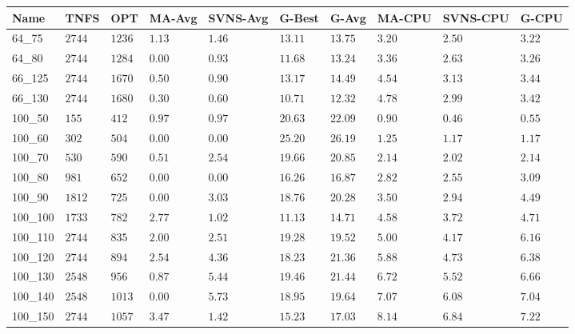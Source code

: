 \begin{center}
\begin{table}[]
\centering
\begin{tabular}{|lll|l|l|ll|lll|}
\hline
Name     & TNFS        & OPT    & MA-Avg & SVNS-Avg & G-Best & G-Avg & MA-CPU & SVNS-CPU & G-CPU \\
\hline
64\_75   & $2744   $   & $1236$ & $1.13$ & $1.46$   & $13.11$    & $13.75$   & $3.20 $& $2.50$   & $3.22 $ \\
64\_80   & $2744   $   & $1284$ & $\bm{0.00}$ & $0.93$   & $11.68$    & $13.24$   & $3.36 $& $2.63$   & $3.26 $ \\
\hline
66\_125  & $2744   $   & $1670$ & $0.50$ & $0.90$   & $13.17$    & $14.49$   & $4.54 $& $3.13$   & $3.44 $ \\
66\_130  & $2744   $   & $1680$ & $0.30$ & $0.60$   & $10.71$    & $12.32$   & $4.78 $& $2.99$   & $3.42 $ \\
\hline
100\_50  & $155    $   & $412 $ & $0.97$ & $0.97$   & $20.63$    & $22.09$   & $0.90 $& $0.46$   & $0.55 $ \\
100\_60  & $302    $   & $504 $ & $\bm{0.00}$ & $\bm{0.00}$   & $25.20$    & $26.19$   & $1.25 $& $1.17$   & $1.17 $ \\
100\_70  & $530    $   & $590 $ & $0.51$ & $2.54$   & $19.66$    & $20.85$   & $2.14 $& $2.02$   & $2.14 $ \\
100\_80  & $981    $   & $652 $ & $\bm{0.00}$ & $\bm{0.00}$   & $16.26$    & $16.87$   & $2.82 $& $2.55$   & $3.09 $ \\
100\_90  & $1812   $   & $725 $ & $\bm{0.00}$ & $3.03$   & $18.76$    & $20.28$   & $3.50 $& $2.94$   & $4.49 $ \\
100\_100 & $1733   $   & $782 $ & $2.77$ & $1.02$   & $11.13$    & $14.71$   & $4.58 $& $3.72$   & $4.71 $ \\
100\_110 & $2744   $   & $835 $ & $2.00$ & $2.51$   & $19.28$    & $19.52$   & $5.00 $& $4.17$   & $6.16 $ \\
100\_120 & $2744   $   & $894 $ & $2.54$ & $4.36$   & $18.23$    & $21.36$   & $5.88 $& $4.73$   & $6.38 $ \\
100\_130 & $2548   $   & $956 $ & $0.87$ & $5.44$   & $19.46$    & $21.44$   & $6.72 $& $5.52$   & $6.66 $ \\
100\_140 & $2548   $   & $1013$ & $\bm{0.00}$ & $5.73$   & $18.95$    & $19.64$   & $7.07 $& $6.08$   & $7.04 $ \\
100\_150 & $2744   $   & $1057$ & $3.47$ & $1.42$   & $15.23$    & $17.03$   & $8.14 $& $6.84$   & $7.22 $ \\

\end{tabular}
\end{table}
\end{center}
